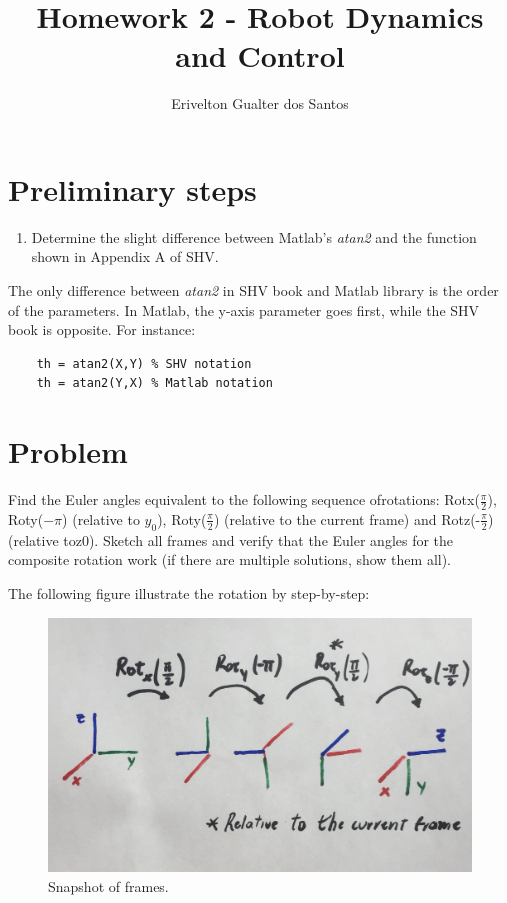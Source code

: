 \documentclass[a4paper,10pt]{article}
\title{Homework 2 - Robot Dynamics and Control}
\author{Erivelton Gualter dos Santos}
\begin{document}
\date{}
\maketitle

\section*{Preliminary steps}

\begin{enumerate}
 \item Determine the slight difference between Matlab’s \textit{atan2} and the function shown in Appendix A of SHV.
\end{enumerate}

The only difference between \textit{atan2} in SHV book and Matlab library is the order of the parameters. In Matlab, the y-axis parameter goes first, while the SHV book is opposite. For instance:

\begin{lstlisting}
    th = atan2(X,Y) % SHV notation
    th = atan2(Y,X) % Matlab notation
\end{lstlisting}


\section{Problem}

Find the Euler angles equivalent to the following sequence ofrotations: Rotx($\frac{\pi}{2}$), Roty($-\pi$) (relative to $y_0$), Roty($\frac{\pi}{2}$) (relative to the current frame) and Rotz(-$\frac{\pi}{2}$) (relative toz0). Sketch all frames and verify that the Euler angles for the composite rotation work (if there are multiple solutions, show them all).

\hfill \break

The following figure illustrate the rotation by step-by-step:

\begin{figure}[H] 
 \centering
 \includegraphics[width=0.7\linewidth]{pb1.jpeg}
 \caption{Snapshot of frames.}\label{fig:frames}
\end{figure}
\end{document}
